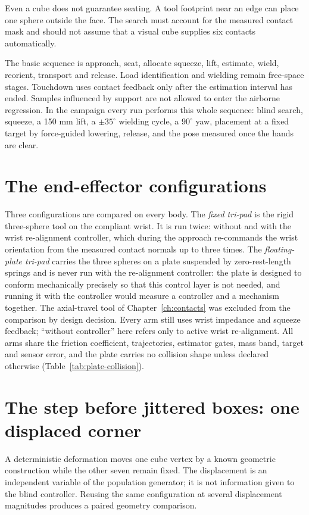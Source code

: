 Even a cube does not guarantee seating. A tool footprint near an edge can place one sphere outside the face. The search must account for the measured contact mask and should not assume that a visual cube supplies six contacts automatically.

The basic sequence is approach, seat, allocate squeeze, lift, estimate, wield, reorient, transport and release. Load identification and wielding remain free-space stages. Touchdown uses contact feedback only after the estimation interval has ended. Samples influenced by support are not allowed to enter the airborne regression. In the campaign every run performs this whole sequence: blind search, squeeze, a 150 mm lift, a $\pm35^\circ$ wielding cycle, a $90^\circ$ yaw, placement at a fixed target by force-guided lowering, release, and the pose measured once the hands are clear.

\section{The end-effector configurations}
\label{sec:geo-arms}

Three configurations are compared on every body. The \emph{fixed tri-pad} is the rigid three-sphere tool on the compliant wrist. It is run twice: without and with the wrist re-alignment controller, which during the approach re-commands the wrist orientation from the measured contact normals up to three times. The \emph{floating-plate tri-pad} carries the three spheres on a plate suspended by zero-rest-length springs and is never run with the re-alignment controller: the plate is designed to conform mechanically precisely so that this control layer is not needed, and running it with the controller would measure a controller and a mechanism together. The axial-travel tool of Chapter~\ref{ch:contacts} was excluded from the comparison by design decision. Every arm still uses wrist impedance and squeeze feedback; ``without controller'' here refers only to active wrist re-alignment. All arms share the friction coefficient, trajectories, estimator gates, mass band, target and sensor error, and the plate carries no collision shape unless declared otherwise (Table~\ref{tab:plate-collision}).

\section{The step before jittered boxes: one displaced corner}

A deterministic deformation moves one cube vertex by a known geometric construction while the other seven remain fixed. The displacement is an independent variable of the population generator; it is not information given to the blind controller. Reusing the same configuration at several displacement magnitudes produces a paired geometry comparison.

